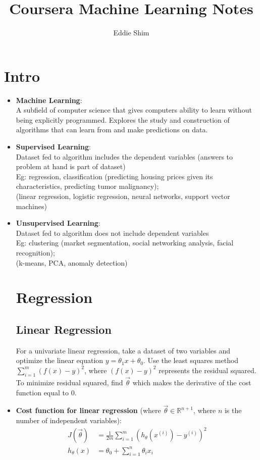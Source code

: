 \documentclass[titlepage]{article}
\author{Eddie Shim}
\title{Coursera Machine Learning Notes}
\begin{document}
	\maketitle
\section{Intro}
\begin{itemize}
	
	\item \textbf{Machine Learning}:
	\\ A subfield of computer science that gives computers ability to learn without being explicitly programmed. Explores the study and construction of algorithms that can learn from and make predictions on data.
	\\
	\item \textbf{Supervised Learning}:
	\\Dataset fed to algorithm includes the dependent variables (answers to problem at hand is part of dataset) \\Eg: regression, classification (predicting housing prices given its characteristics, predicting tumor malignancy); \\(linear regression, logistic regression, neural networks, support vector machines)
	\\
	\item \textbf{Unsupervised Learning}:
	\\Dataset fed to algorithm does not include dependent variables \\Eg: clustering (market segmentation, social networking analysis, facial recognition); \\(k-means, PCA, anomaly detection)
	
	\section{Regression}
	\subsection{Linear Regression}
	For a univariate linear regression, take a dataset of two variables and optimize the linear equation $y= \theta_1 x + \theta_0$. Use the least squares method $\sum_{i=1}^{m} (f(x)-y)^2$, where $(f(x)-y)^2$ represents the residual squared. To minimize residual squared, find $\vec\theta$ which makes the derivative of the cost function equal to 0.
	
	\item \textbf{Cost function for linear regression} (where $\vec{\theta} \in \mathbb{R}^{n+1}$, where $n$ is the number of independent variables):
	\begin{align*}
		J(\vec\theta) &= \frac{1}{2m} \sum_{i=1}^{m}(h_{\theta}(x^{(i)}) - y^{(i)})^2\\
		h_\theta(x) &= \theta_0 + \sum_{i=1}^{n} \theta_i x_i
	\end{align*}
	

\end{itemize}
\end{document}
